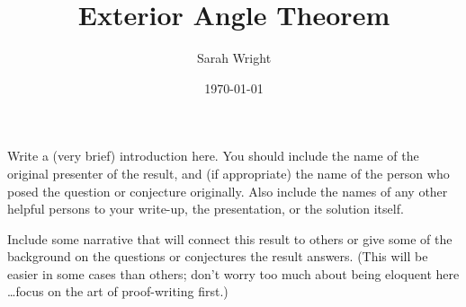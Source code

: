\usepackage{wasysym} %

\title{Exterior Angle Theorem}

\author{Sarah Wright}

\date{\today}



\maketitle

Write a (very brief) introduction here.  You should include the name of the original presenter of the result, and (if appropriate) the name of the person who posed the question or conjecture originally.  Also include the names of any other helpful persons to your write-up, the presentation, or the solution itself.

Include some narrative that will connect this result to others or give some of the background on the questions or conjectures the result answers.  (This will be easier in some cases than others; don't worry too much about being eloquent here \dots focus on the art of proof-writing first.)

\setcounter{section}{1}
\setcounter{theorem}{15}


